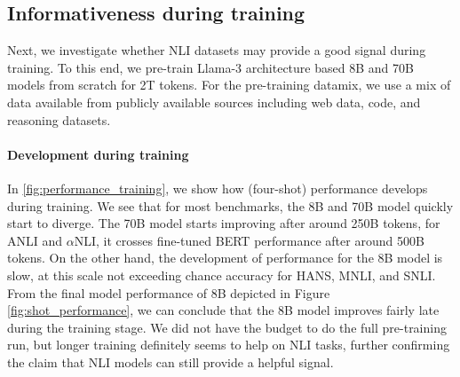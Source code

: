 \subsection{Informativeness during training}\label{subsec:during_training}

Next, we investigate whether NLI datasets may provide a good signal during training.
To this end, we pre-train Llama-3 architecture based 8B and 70B models from scratch for 2T tokens. For the pre-training datamix, we use a mix of data available from publicly available sources including web data, code, and reasoning datasets.

\paragraph{Development during training} In \cref{fig:performance_training}, we show how (four-shot) performance develops during training.
We see that for most benchmarks, the 8B and 70B model quickly start to diverge.
The 70B model starts improving after around 250B tokens, for ANLI and $\alpha$NLI, it crosses fine-tuned BERT performance after around 500B tokens.
On the other hand, the development of performance for the 8B model is slow, at this scale not exceeding chance accuracy for HANS, MNLI, and SNLI.
From the final model performance of 8B depicted in Figure \cref{fig:shot_performance}, we can conclude that the 8B model improves fairly late during the training stage.
We did not have the budget to do the full pre-training run, but longer training definitely seems to help on NLI tasks, further confirming the claim that NLI models can still provide a helpful signal.

